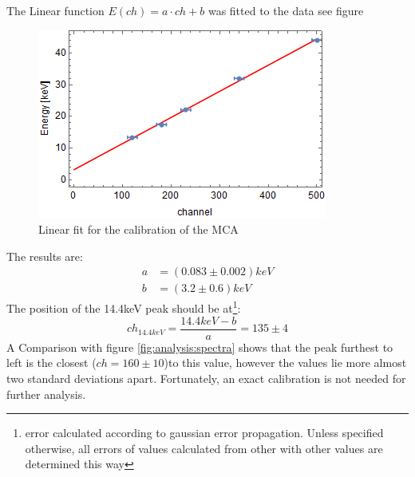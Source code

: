 The Linear function $E(ch)=a\cdot ch+b$ was fitted to the data see figure
\begin{figure}[H]
\centering
\includegraphics[width=1.0\linewidth]{../results/calibration/fit}
\caption[MCA calibration]{Linear fit for the calibration of the MCA}
\label{fig:calibrationfit}
\end{figure}
The results are:
\begin{equation}
\begin{aligned}
	a &= (0.083\pm0.002)keV\\
	b &= (3.2 \pm 0.6)keV
\end{aligned}
\end{equation}
The position of the 14.4keV peak should be at\footnote{error calculated according to gaussian error propagation. Unless specified otherwise, all errors of values calculated from other with other values are determined this way}:
\begin{equation}
ch_{14.4keV}=\frac{14.4keV-b}{a}=135\pm4
\end{equation}
A Comparison with figure \ref{fig:analysis:spectra} shows that the peak furthest to left is the closest ($ch=160\pm10$)to this value, however the values lie more almost two standard deviations apart. Fortunately, an exact calibration is not needed for further analysis.

